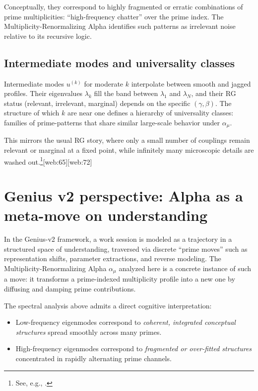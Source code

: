 \documentclass[11pt]{article}
\begin{document}
Conceptually, they correspond to highly fragmented or erratic combinations of prime multiplicities: ``high-frequency chatter'' over the prime index.
The Multiplicity-Renormalizing Alpha identifies such patterns as irrelevant noise relative to its recursive logic.

\subsection{Intermediate modes and universality classes}

Intermediate modes $u^{(k)}$ for moderate $k$ interpolate between smooth and jagged profiles.
Their eigenvalues $\lambda_k$ fill the band between $\lambda_1$ and $\lambda_N$, and their RG status (relevant, irrelevant, marginal) depends on the specific $(\gamma,\beta)$.
The structure of which $k$ are near one defines a hierarchy of universality classes: families of prime-patterns that share similar large-scale behavior under $\alpha_\mu$.

This mirrors the usual RG story, where only a small number of couplings remain relevant or marginal at a fixed point, while infinitely many microscopic details are washed out.\footnote{See, e.g., \cite{Goldenfeld1992,ZinnJustin2007}.}[web:65][web:72]


\section{Genius v2 perspective: Alpha as a meta-move on understanding}

In the Genius-v2 framework, a work session is modeled as a trajectory in a structured space of understanding, traversed via discrete ``prime moves'' such as representation shifts, parameter extractions, and reverse modeling.
The Multiplicity-Renormalizing Alpha $\alpha_\mu$ analyzed here is a concrete instance of such a move: it transforms a prime-indexed multiplicity profile into a new one by diffusing and damping prime contributions.

The spectral analysis above admits a direct cognitive interpretation:
\begin{itemize}
    \item Low-frequency eigenmodes correspond to \emph{coherent, integrated conceptual structures} spread smoothly across many primes.
    \item High-frequency eigenmodes correspond to \emph{fragmented or over-fitted structures} concentrated in rapidly alternating prime channels.
\end{itemize}
\end{document}
